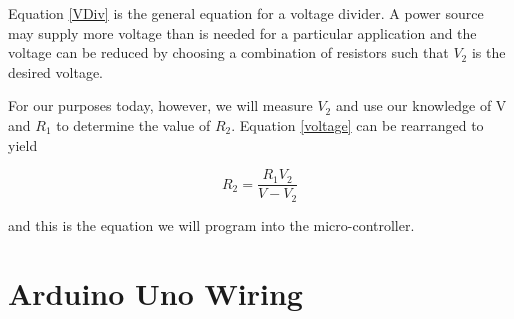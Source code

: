 \documentclass[]{article}
\begin{document}
	Equation \ref{VDiv} is the general equation for a voltage divider.  A power source may supply more voltage than is needed for a particular application and the voltage can be reduced by choosing a combination of resistors such that $V_2$ is the desired voltage.

	For our purposes today, however, we will measure $V_2$ and use our knowledge of V and $R_1$ to determine the value of $R_2$.  Equation \ref{voltage} can be rearranged to yield

	\begin{equation}
		R_2 = \frac{R_1V_2}{V-V_2}
	\end{equation}

	and this is the equation we will program into the micro-controller.

\section{Arduino Uno Wiring}
\end{document}
